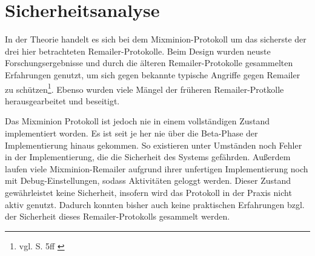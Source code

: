 \section{Sicherheitsanalyse}
In der Theorie handelt es sich bei dem Mixminion-Protokoll um das sicherste der drei hier betrachteten Remailer-Protokolle. Beim Design wurden neuste Forschungsergebnisse und durch die älteren Remailer-Protokolle gesammelten Erfahrungen genutzt, um sich gegen bekannte typische Angriffe gegen Remailer zu schützen\footnote{vgl. S. 5ff \cite{mixminion}}. Ebenso wurden viele Mängel der früheren Remailer-Protkolle herausgearbeitet und beseitigt. 

Das Mixminion Protokoll ist jedoch nie in einem vollständigen Zustand implementiert worden. Es ist seit je her nie über die Beta-Phase der Implementierung hinaus gekommen. So existieren unter Umständen noch Fehler in der Implementierung, die die Sicherheit des Systems gefährden. Außerdem laufen viele Mixminion-Remailer aufgrund ihrer unfertigen Implementierung noch mit Debug-Einstellungen, sodass Aktivitäten geloggt werden. Dieser Zustand gewährleistet keine Sicherheit, insofern wird das Protokoll in der Praxis nicht aktiv genutzt. Dadurch konnten bisher auch keine praktischen Erfahrungen bzgl. der Sicherheit dieses Remailer-Protokolls gesammelt werden.


